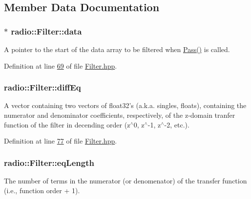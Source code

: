 \subsection{Member Data Documentation}
\hypertarget{classradio_1_1Filter_a25459a2b762120df0102f00553344be2}{
\subsubsection[{data}]{$\ast$ radio\+::\+Filter\+::data\hspace{0.3cm}{\ttfamily [protected]}}}\label{classradio_1_1Filter_a25459a2b762120df0102f00553344be2}
A pointer to the start of the data array to be filtered when \hyperlink{classradio_1_1Filter_ad2793821801780809af385463bf8f197}{Pass()} is called. 

Definition at line \hyperlink{Filter_8hpp_source_l00069}{69} of file \hyperlink{Filter_8hpp_source}{Filter.\+hpp}.

\hypertarget{classradio_1_1Filter_abe705768a267844edfa2aaabfdac9f56}{
\subsubsection[{diff\+Eq}]{ radio\+::\+Filter\+::diff\+Eq\hspace{0.3cm}{\ttfamily [protected]}}}\label{classradio_1_1Filter_abe705768a267844edfa2aaabfdac9f56}
A vector containing two vectors of float32's (a.\+k.\+a. singles, floats), containing the numerator and denominator coefficients, respectively, of the z-\/domain tranfer function of the filter in decending order (z$^\wedge$0, z$^\wedge$-\/1, z$^\wedge$-\/2, etc.). 

Definition at line \hyperlink{Filter_8hpp_source_l00077}{77} of file \hyperlink{Filter_8hpp_source}{Filter.\+hpp}.

\hypertarget{classradio_1_1Filter_a26a32320c4dffa8925ab5f0f06689e8d}{
\subsubsection[{eq\+Length}]{ radio\+::\+Filter\+::eq\+Length\hspace{0.3cm}{\ttfamily [protected]}}}\label{classradio_1_1Filter_a26a32320c4dffa8925ab5f0f06689e8d}
The number of terms in the numerator (or denomenator) of the transfer function (i.\+e., function order + 1). 

